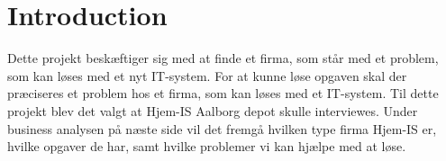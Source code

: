 \chapter{Introduction}\label{ch:introduction}
Dette projekt beskæftiger sig med at finde et firma, som står med et problem, som kan løses med et nyt IT-system. For at kunne løse opgaven skal der præciseres et problem hos et firma, som kan løses med et IT-system. Til dette projekt blev det valgt at Hjem-IS Aalborg depot skulle interviewes. Under business analysen på næste side vil det fremgå hvilken type firma Hjem-IS er, hvilke opgaver de har, samt hvilke problemer vi kan hjælpe med at løse.
